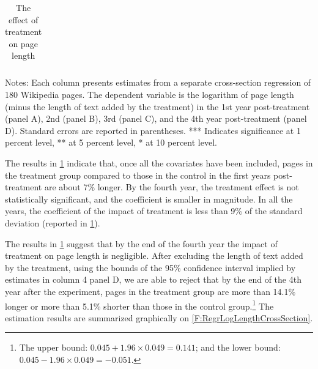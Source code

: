 \documentclass[12pt]{article}
\begin{document}
\begin{table}[h!]
\begin{center}
\caption{The effect of treatment on page length}
\label{T:RegrLogLengthCrossSection}
\renewcommand{\tabcolsep}{2pt}
\begin{tabular}{l cccc@{\hskip 0.2in} cccc}
\hline

\hline
\end{tabular}
\end{center}
\footnotesize{
Notes:
Each column presents estimates from a separate cross-section regression of 180 Wikipedia pages. The dependent variable is the logarithm of page length (minus the length of text added by the treatment) in the 1st year post-treatment (panel A), 2nd (panel B), 3rd (panel C), and the 4th year post-treatment (panel D).
Standard errors are reported in parentheses. *** Indicates significance at 1 percent level, ** at 5 percent level, * at 10 percent level.
}
\end{table}

The results in \cref{T:RegrLogLengthCrossSection} indicate that, once all the covariates have been included, pages in the treatment group compared to those in the control in the first years post-treatment are about 7\% longer. By the fourth year, the treatment effect is not statistically significant, and the coefficient is smaller in magnitude. In all the years, the coefficient  of the impact of treatment is less than 9\% of the standard deviation (reported in  \cref{T:RegrLogLengthCrossSection}).  

The results in \cref{T:RegrLogLengthCrossSection} suggest that by the end of the fourth year the impact of treatment on page length is negligible. 
After excluding the length of text added by the treatment, using the bounds of the 95\% confidence interval implied by estimates in column 4 panel D, we are able to reject that by the end of the 4th year after the experiment, pages in the treatment group are more than 14.1\% longer or more than 5.1\% shorter than those in the control group.\footnote{The upper bound: $0.045 + 1.96\times 0.049 = 0.141$; and the lower bound: $0.045-1.96\times 0.049 = -0.051$.} 
The estimation results are summarized graphically on \cref{F:RegrLogLengthCrossSection}.
\end{document}
